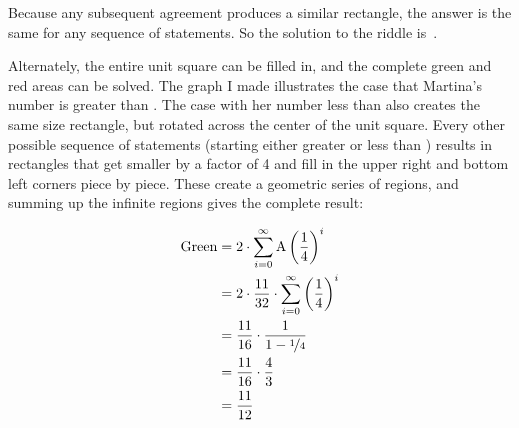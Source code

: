 \documentclass{article}
\begin{document}
Because any subsequent agreement produces a similar rectangle, the answer is the same for any sequence of statements.
So the solution to the riddle is
\,.


Alternately, the entire unit square can be filled in, and the complete green and red areas can be solved.
The graph I made illustrates the case that Martina's number is greater than .
The case with her number less than  also creates the same size rectangle, but rotated across the center of the unit square.
Every other possible sequence of statements (starting either greater or less than ) results in rectangles that get smaller by a factor of 4 and fill in the upper right and bottom left corners piece by piece.
These create a geometric series of regions, and summing up the infinite regions gives the complete result:

\begin{align*}
\textrm{Green}&=2\cdot\sum_{i=0}^{\infty}\textrm{A}\left(\frac{1}{4}\right)^{i} \\
              &=2\cdot\frac{11}{32}\cdot\sum_{i=0}^{\infty}\left(\frac{1}{4}\right)^{i} \\
              &=\frac{11}{16}\cdot\frac{1}{1-\nicefrac{1}{4}} \\
              &=\frac{11}{16}\cdot\frac{4}{3} \\
              &=\frac{11}{12}
\end{align*}
\end{document}
